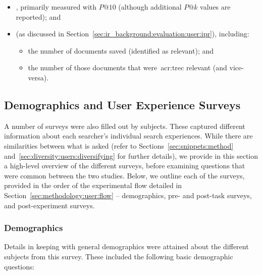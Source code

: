 \begin{itemize}
    \item{, primarily measured with $P@10$ (although additional $P@k$ values are reported); and}
    \item{ (as discussed in Section~\ref{sec:ir_background:evaluation:user:ipr}), including:}
    
    \begin{itemize}
        \item{the number of documents saved (identified as relevant); and}
        \item{the number of those documents that were~\gls{acr:trec} relevant (and vice-versa).}
    \end{itemize}
\end{itemize}


\subsection{Demographics and User Experience Surveys}\label{sec:methodology:extracting:user}
A number of surveys were also filled out by subjects. These captured different information about each searcher's individual search experiences. While there are similarities between what is asked (refer to Sections~\ref{sec:snippets:method} and~\ref{sec:diversity:users:diversifying} for further details), we provide in this section a high-level overview of the different surveys, before examining questions that were common between the two studies. Below, we outline each of the surveys, provided in the order of the experimental flow detailed in Section~\ref{sec:methodology:user:flow} -- demographics, pre- and post-task surveys, and post-experiment surveys.

\subsubsection{Demographics}
Details in keeping with general demographics were attained about the different subjects from this survey. These included the following basic demographic questions:

